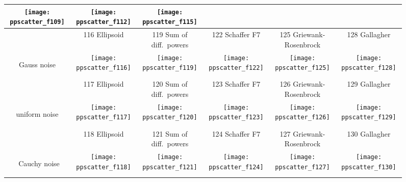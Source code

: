 \documentclass[conference]{IEEEtran}
\begin{document}
\begin{figure*}
\begin{tabular}{@{}c@{}*{5}{@{}c@{}}}
    \texttt{[image: ppscatter\_f109]}&
    \texttt{[image: ppscatter\_f112]}&
    \texttt{[image: ppscatter\_f115]}\\\hline
 & {\sf\footnotesize 116 Ellipsoid} & {\sf\footnotesize 119 Sum of diff.\ powers} & {\sf\footnotesize 122 Schaffer F7} & {\sf\footnotesize 125 Griewank-Rosenbrock} & {\sf\footnotesize 128 Gallagher}\\
\begin{turn}{90}\parbox{0.175\textwidth}{\centering\sf Gauss noise}\end{turn} &
    \texttt{[image: ppscatter\_f116]}&
    \texttt{[image: ppscatter\_f119]}&
    \texttt{[image: ppscatter\_f122]}&
    \texttt{[image: ppscatter\_f125]}&
    \texttt{[image: ppscatter\_f128]}\\
 & {\sf\footnotesize 117 Ellipsoid} & {\sf\footnotesize 120 Sum of diff.\ powers} & {\sf\footnotesize 123 Schaffer F7} & {\sf\footnotesize 126 Griewank-Rosenbrock} & {\sf\footnotesize 129 Gallagher}\\
\begin{turn}{90}\parbox{0.175\textwidth}{\centering\sf uniform noise}\end{turn} &
    \texttt{[image: ppscatter\_f117]}&
    \texttt{[image: ppscatter\_f120]}&
    \texttt{[image: ppscatter\_f123]}&
    \texttt{[image: ppscatter\_f126]}&
    \texttt{[image: ppscatter\_f129]}\\
& {\sf\footnotesize 118 Ellipsoid} & {\sf\footnotesize 121 Sum of diff.\ powers} & {\sf\footnotesize 124 Schaffer F7} & {\sf\footnotesize 127 Griewank-Rosenbrock} & {\sf\footnotesize 130 Gallagher}\\
\begin{turn}{90}\parbox{0.175\textwidth}{~\centering\sf Cauchy noise}\end{turn} &
    \texttt{[image: ppscatter\_f118]}&
    \texttt{[image: ppscatter\_f121]}&
    \texttt{[image: ppscatter\_f124]}&
    \texttt{[image: ppscatter\_f127]}&
    \texttt{[image: ppscatter\_f130]}
\end{tabular}
\caption{\label{fig:scatterplots}
}
\end{figure*}
\end{document}
